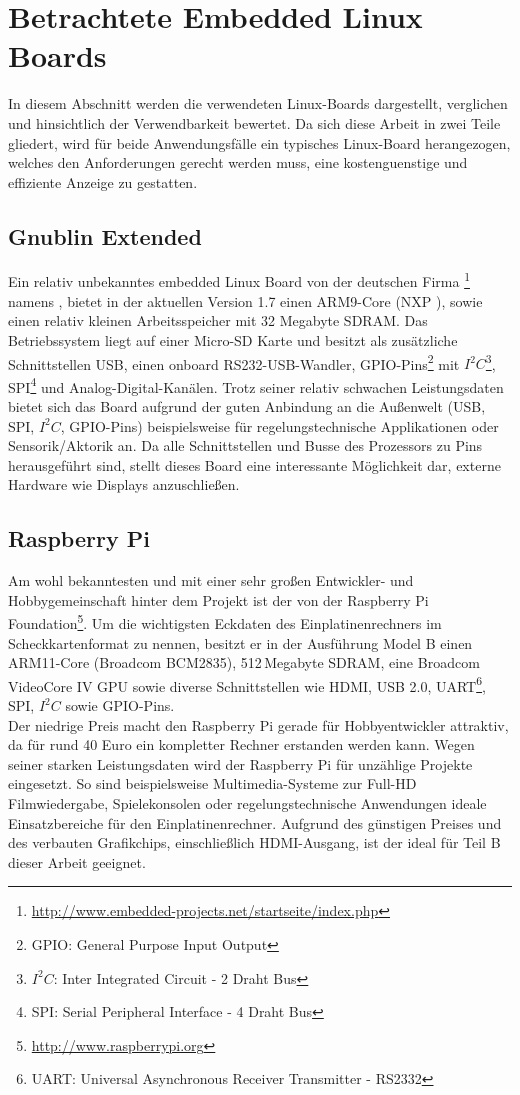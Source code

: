 \section{Betrachtete Embedded Linux Boards}
\label{cha:betrachtete_linux_boards}
In diesem Abschnitt werden die verwendeten Linux-Boards dargestellt, verglichen und hinsichtlich der Verwendbarkeit bewertet. Da sich diese Arbeit in zwei Teile gliedert, wird für beide Anwendungsfälle ein typisches Linux-Board herangezogen, welches den Anforderungen gerecht werden muss, eine kostenguenstige und effiziente Anzeige zu gestatten.
\subsection{Gnublin Extended}
\label{cha:gnublin_extended}
Ein relativ unbekanntes embedded Linux Board von der deutschen Firma \footnote{\url{http://www.embedded-projects.net/startseite/index.php}} namens , bietet in der aktuellen Version 1.7 einen ARM9-Core (NXP ), sowie einen relativ kleinen Arbeitsspeicher mit 32 Megabyte SDRAM. Das Betriebssystem liegt auf einer Micro-SD Karte und besitzt als zusätzliche Schnittstellen USB, einen onboard RS232-USB-Wandler, GPIO-Pins\footnote{GPIO: General Purpose Input Output} mit $I^2C$\footnote{$I^2C$: Inter Integrated Circuit - 2 Draht Bus}, SPI\footnote{SPI: Serial Peripheral Interface - 4 Draht Bus} und Analog-Digital-Kanälen. Trotz seiner relativ schwachen Leistungsdaten bietet sich das Board aufgrund der guten Anbindung an die Außenwelt (USB, SPI, $I^2C$, GPIO-Pins) beispielsweise für regelungstechnische Applikationen oder Sensorik/Aktorik an.
Da alle Schnittstellen und Busse des Prozessors zu Pins herausgeführt sind, stellt dieses Board eine interessante Möglichkeit dar, externe Hardware wie Displays anzuschließen. 
\subsection{Raspberry Pi}
\label{cha:raspberry}
Am wohl bekanntesten und mit einer sehr großen Entwickler- und Hobbygemeinschaft hinter dem Projekt ist der  von der Raspberry Pi Foundation\footnote{\url{http://www.raspberrypi.org}}. Um die wichtigsten Eckdaten des Einplatinenrechners im Scheckkartenformat zu nennen, besitzt er in der Ausführung Model B einen ARM11-Core (Broadcom BCM2835), 512\,Megabyte SDRAM, eine Broadcom VideoCore IV GPU sowie diverse Schnittstellen wie HDMI, USB 2.0, UART\footnote{UART: Universal Asynchronous Receiver Transmitter - RS2332}, SPI, $I^2C$ sowie GPIO-Pins.\\
Der niedrige Preis macht den Raspberry Pi gerade für Hobbyentwickler attraktiv, da für rund 40 Euro ein kompletter Rechner erstanden werden kann. Wegen seiner starken Leistungsdaten wird der Raspberry Pi für unzählige Projekte eingesetzt. So sind beispielsweise Multimedia-Systeme zur Full-HD Filmwiedergabe, Spielekonsolen oder regelungstechnische Anwendungen ideale Einsatzbereiche für den Einplatinenrechner.
Aufgrund des günstigen Preises und des verbauten Grafikchips, einschließlich HDMI-Ausgang, ist der  ideal für Teil B dieser Arbeit geeignet.